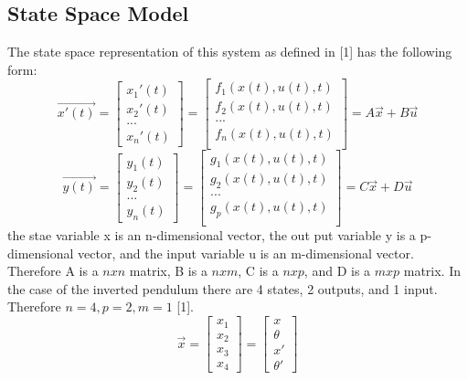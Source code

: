 \documentclass[12pt]{article} %
\begin{document}
\subsection{State Space Model}
The state space representation of this system as defined in [1] has the following form:
\begin{equation} \label{eq:ssfdef}
 \vec{x'(t)} = 
\begin{bmatrix}
x_1'(t) \\
x_2'(t) \\
... \\
x_n'(t)
\end{bmatrix}
= 
\begin{bmatrix}
f_1(x(t), u(t), t) \\
f_2(x(t), u(t), t) \\
... \\
f_n(x(t), u(t), t) \\
\end{bmatrix}
= A\vec{x} + B\vec{u}
\end{equation}
\begin{equation}
 \vec{y(t)} = 
\begin{bmatrix}
y_1(t) \\
y_2(t) \\
... \\
y_n(t)
\end{bmatrix}
= 
\begin{bmatrix}
g_1(x(t), u(t), t) \\
g_2(x(t), u(t), t) \\
... \\
g_p(x(t), u(t), t) \\
\end{bmatrix}
= C\vec{x} + D\vec{u}
\end{equation}
the stae variable x is an n-dimensional vector, the out put variable y is a  p-dimensional vector, and the input variable u is an m-dimensional vector. Therefore A is a $nxn$ matrix, B is a $nxm$, C is a $nxp$, and D is a $mxp$ matrix. In the case of the inverted pendulum there are 4 states, 2 outputs, and 1 input. Therefore  $n = 4, p = 2, m = 1$ [1].
\begin{equation}
\vec{x} = 
\begin{bmatrix}
x_1 \\
x_2 \\
x_3 \\
x_4
\end{bmatrix}
=
\begin{bmatrix}
x \\
\theta \\
x' \\
\theta' 
\end{bmatrix}
\end{equation}
\end{document}
